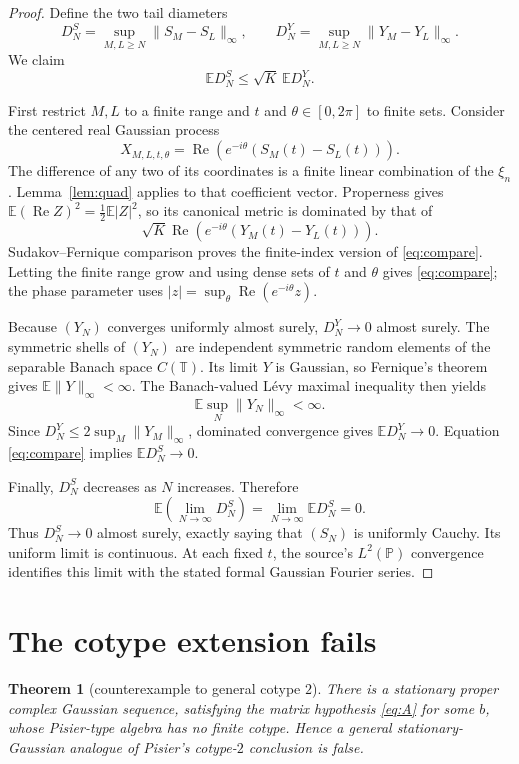 \documentclass[11pt]{article}
\newtheorem{theorem}{Theorem}
\newcommand{\T}{\mathbb T}
\newcommand{\E}{\mathbb E}
\begin{document}
\begin{proof}
Define the two tail diameters
\[
 D_N^S=\sup_{M,L\ge N}\|S_M-S_L\|_\infty,
 \qquad
 D_N^Y=\sup_{M,L\ge N}\|Y_M-Y_L\|_\infty.
\]
We claim
\begin{equation}\label{eq:compare}
 \E D_N^S\le \sqrt K\,\E D_N^Y.
\end{equation}

First restrict $M,L$ to a finite range and $t$ and
$\theta\in[0,2\pi]$ to finite sets.  Consider the centered real Gaussian
process
\[
 X_{M,L,t,\theta}
 =\operatorname{Re}\!\left(e^{-i\theta}(S_M(t)-S_L(t))\right).
\]
The difference of any two of its coordinates is a finite linear combination
of the $\xi_n$.  Lemma~\ref{lem:quad} applies to that coefficient vector.
Properness gives
$\E(\operatorname{Re}Z)^2=\frac12\E|Z|^2$, so its canonical metric is
dominated by that of
\[
 \sqrt K\operatorname{Re}\!\left(e^{-i\theta}
 (Y_M(t)-Y_L(t))\right).
\]
Sudakov--Fernique comparison proves the finite-index version of
\eqref{eq:compare}.  Letting the finite range grow and using dense sets of
$t$ and $\theta$ gives \eqref{eq:compare}; the phase parameter uses
$|z|=\sup_\theta\operatorname{Re}(e^{-i\theta}z)$.

Because $(Y_N)$ converges uniformly almost surely, $D_N^Y\to0$ almost
surely.  The symmetric shells of $(Y_N)$ are independent symmetric random
elements of the separable Banach space $C(\T)$.  Its limit $Y$ is Gaussian,
so Fernique's theorem gives $\E\|Y\|_\infty<\infty$.  The Banach-valued
L\'evy maximal inequality then yields
\[
 \E\sup_N\|Y_N\|_\infty<\infty.
\]
Since $D_N^Y\le2\sup_M\|Y_M\|_\infty$, dominated convergence gives
$\E D_N^Y\to0$.  Equation \eqref{eq:compare} implies
$\E D_N^S\to0$.

Finally, $D_N^S$ decreases as $N$ increases.  Therefore
\[
 \E\left(\lim_{N\to\infty}D_N^S\right)
 =\lim_{N\to\infty}\E D_N^S=0.
\]
Thus $D_N^S\to0$ almost surely, exactly saying that $(S_N)$ is uniformly
Cauchy.  Its uniform limit is continuous.  At each fixed $t$, the source's
$L^2(\mathbb P)$ convergence identifies this limit with the stated formal
Gaussian Fourier series.
\end{proof}

\section{The cotype extension fails}

\begin{theorem}[counterexample to general cotype $2$]\label{thm:cotype}
There is a stationary proper complex Gaussian sequence, satisfying the
matrix hypothesis \eqref{eq:A} for some $b$, whose Pisier-type algebra has
no finite cotype.  Hence a general stationary-Gaussian analogue of Pisier's
cotype-$2$ conclusion is false.
\end{theorem}
\end{document}
